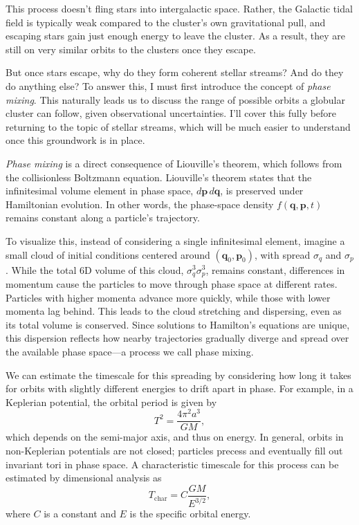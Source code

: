         This process doesn't fling stars into intergalactic space. Rather, the Galactic tidal field is typically weak compared to the cluster's own gravitational pull, and escaping stars gain just enough energy to leave the cluster. As a result, they are still on very similar orbits to the clusters once they escape.

        But once stars escape, why do they form coherent stellar streams? And do they do anything else? To answer this, I must first introduce the concept of \textit{phase mixing}. This naturally leads us to discuss the range of possible orbits a globular cluster can follow, given observational uncertainties. I'll cover this fully before returning to the topic of stellar streams, which will be much easier to understand once this groundwork is in place.
        
        \textit{Phase mixing} is a direct consequence of Liouville's theorem, which follows from the collisionless Boltzmann equation. Liouville's theorem states that the infinitesimal volume element in phase space, \( d\mathbf{p}\,d\mathbf{q} \), is preserved under Hamiltonian evolution. In other words, the phase-space density \( f(\mathbf{q}, \mathbf{p}, t) \) remains constant along a particle's trajectory.

        To visualize this, instead of considering a single infinitesimal element, imagine a small cloud of initial conditions centered around \((\mathbf{q}_0, \mathbf{p}_0)\), with spread \(\sigma_q\) and \(\sigma_p\). While the total 6D volume of this cloud, \(\sigma_q^3 \sigma_p^3\), remains constant, differences in momentum cause the particles to move through phase space at different rates. Particles with higher momenta advance more quickly, while those with lower momenta lag behind. This leads to the cloud stretching and dispersing, even as its total volume is conserved. Since solutions to Hamilton's equations are unique, this dispersion reflects how nearby trajectories gradually diverge and spread over the available phase space—a process we call phase mixing.

        We can estimate the timescale for this spreading by considering how long it takes for orbits with slightly different energies to drift apart in phase. For example, in a Keplerian potential, the orbital period is given by
        \begin{equation}
            T^2 = \frac{4\pi^2 a^3}{GM},
        \end{equation}
        which depends on the semi-major axis, and thus on energy. In general, orbits in non-Keplerian potentials are not closed; particles precess and eventually fill out invariant tori in phase space. A characteristic timescale for this process can be estimated by dimensional analysis as
        \begin{equation}
            T_\mathrm{char} = C \frac{GM}{E^{3/2}},
        \end{equation}
        where \(C\) is a constant and \(E\) is the specific orbital energy.

